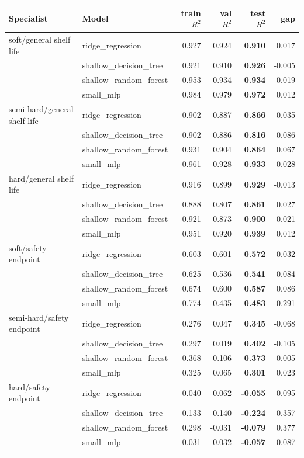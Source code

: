 \begin{tabular}{llrrrr}
\toprule
Specialist & Model & train $R^2$ & val $R^2$ & test $R^2$ & gap \\
\midrule
soft/general shelf life & ridge\_regression & 0.927 & 0.924 & \textbf{0.910} & 0.017 \\
 & shallow\_decision\_tree & 0.921 & 0.910 & \textbf{0.926} & -0.005 \\
 & shallow\_random\_forest & 0.953 & 0.934 & \textbf{0.934} & 0.019 \\
 & small\_mlp & 0.984 & 0.979 & \textbf{0.972} & 0.012 \\
\addlinespace[2pt]
semi-hard/general shelf life & ridge\_regression & 0.902 & 0.887 & \textbf{0.866} & 0.035 \\
 & shallow\_decision\_tree & 0.902 & 0.886 & \textbf{0.816} & 0.086 \\
 & shallow\_random\_forest & 0.931 & 0.904 & \textbf{0.864} & 0.067 \\
 & small\_mlp & 0.961 & 0.928 & \textbf{0.933} & 0.028 \\
\addlinespace[2pt]
hard/general shelf life & ridge\_regression & 0.916 & 0.899 & \textbf{0.929} & -0.013 \\
 & shallow\_decision\_tree & 0.888 & 0.807 & \textbf{0.861} & 0.027 \\
 & shallow\_random\_forest & 0.921 & 0.873 & \textbf{0.900} & 0.021 \\
 & small\_mlp & 0.951 & 0.920 & \textbf{0.939} & 0.012 \\
\addlinespace[2pt]
soft/safety endpoint & ridge\_regression & 0.603 & 0.601 & \textbf{0.572} & 0.032 \\
 & shallow\_decision\_tree & 0.625 & 0.536 & \textbf{0.541} & 0.084 \\
 & shallow\_random\_forest & 0.674 & 0.600 & \textbf{0.587} & 0.086 \\
 & small\_mlp & 0.774 & 0.435 & \textbf{0.483} & 0.291 \\
\addlinespace[2pt]
semi-hard/safety endpoint & ridge\_regression & 0.276 & 0.047 & \textbf{0.345} & -0.068 \\
 & shallow\_decision\_tree & 0.297 & 0.019 & \textbf{0.402} & -0.105 \\
 & shallow\_random\_forest & 0.368 & 0.106 & \textbf{0.373} & -0.005 \\
 & small\_mlp & 0.325 & 0.065 & \textbf{0.301} & 0.023 \\
\addlinespace[2pt]
hard/safety endpoint & ridge\_regression & 0.040 & -0.062 & \textbf{-0.055} & 0.095 \\
 & shallow\_decision\_tree & 0.133 & -0.140 & \textbf{-0.224} & 0.357 \\
 & shallow\_random\_forest & 0.298 & -0.031 & \textbf{-0.079} & 0.377 \\
 & small\_mlp & 0.031 & -0.032 & \textbf{-0.057} & 0.087 \\
\addlinespace[2pt]
\bottomrule
\end{tabular}